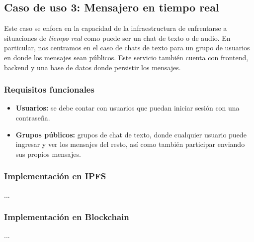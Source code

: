 \subsection{Caso de uso 3: Mensajero en tiempo real}

Este caso se enfoca en la capacidad de la infraestructura de enfrentarse a situaciones de \textit{tiempo real} como puede ser un chat de texto o de audio. En particular, nos centramos en el caso de chats de texto para un grupo de usuarios en donde los mensajes sean públicos. Este servicio también cuenta con frontend, backend y una base de datos donde persistir los mensajes.

\subsubsection{Requisitos funcionales}

\begin{itemize}
    \item \textbf{Usuarios:} se debe contar con usuarios que puedan iniciar sesión con una contraseña.
    \item \textbf{Grupos públicos:} grupos de chat de texto, donde cualquier usuario puede ingresar y ver los mensajes del resto, así como también participar enviando sus propios mensajes.
\end{itemize}

\subsubsection{Implementación en IPFS}

...

\subsubsection{Implementación en Blockchain}

...